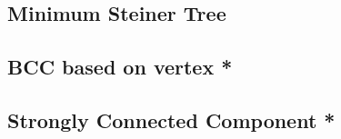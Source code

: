 \documentclass[a4paper,10pt,twocolumn,oneside]{article}
\begin{document}
% 

% 

% 

\subsection{Minimum Steiner Tree}


\subsection{BCC based on vertex *}


\subsection{Strongly Connected Component *}


% 

% 

% 
\end{document}
